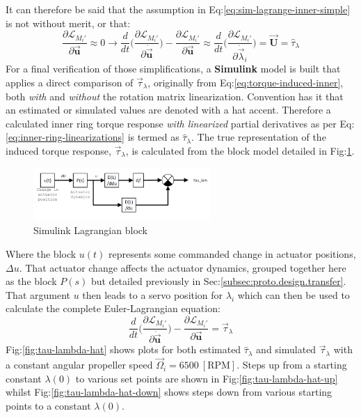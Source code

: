It can therefore be said that the assumption in Eq:\ref{eq:sim-lagrange-inner-simple} is not without merit, or that:
\begin{equation}
\frac{\partial\mathcal{L}_{M_i'}}{\partial\vec{\mathbf{u}}}\approx 0\rightarrow\frac{d}{dt}\bigg(\frac{\partial\mathcal{L}_{M_i'}}{\partial\dot{\vec{\mathbf{u}}}}\bigg)-\frac{\partial\mathcal{L}_{M_i'}}{\partial\vec{\mathbf{u}}}\approx\frac{d}{dt}\Big(\frac{\partial\mathcal{L}_{M_i'}}{\partial\dot{\vec{\lambda}}_i}\Big)=\vec{\mathbf{U}}=\hat{\tau}_\lambda
\end{equation}
For a final verification of those simplifications, a \textbf{Simulink} model is built that applies a direct comparison of $\vec{\tau}_\lambda$, originally from Eq:\ref{eq:torque-induced-inner}, both \emph{with} and \emph{without} the rotation matrix linearization. Convention has it that an estimated or simulated values are denoted with a hat accent. Therefore a calculated inner ring torque response \emph{with linearized} partial derivatives as per Eq:\ref{eq:inner-ring-linearizations} is termed as $\hat{\tau}_\lambda$. The true representation of the induced torque response, $\vec{\tau}_\lambda$, is calculated from the block model detailed in Fig:\ref{fig:linear-block}.
\begin{figure}[htbp]
\centering
\includegraphics[width=0.6\textwidth]{figs/linear-block}
\caption{Simulink Lagrangian block}
\label{fig:linear-block}
\vspace{-15pt}
\end{figure}
\par
Where the block $u(t)$ represents some commanded change in actuator positions, $\Delta u$. That actuator change affects the actuator dynamics, grouped together here as the block $P(s)$ but detailed previously in Sec:\ref{subsec:proto.design.transfer}. That argument $u$ then leads to a servo position for $\lambda_i$ which can then be used to calculate the complete Euler-Lagrangian equation:
\begin{equation}
\frac{d}{dt}\bigg(\frac{\partial\mathcal{L}_{M_i'}}{\partial\dot{\vec{\mathbf{u}}}}\bigg)-\frac{\partial\mathcal{L}_{M_i'}}{\partial\vec{\mathbf{u}}}=\vec{\tau}_\lambda
\end{equation}
Fig:\ref{fig:tau-lambda-hat} shows plots for both estimated $\hat{\tau}_\lambda$ and simulated $\vec{\tau}_\lambda$ with a constant angular propeller speed $\vec{\Omega}_i=6500~[\text{RPM}]$. Steps up from a starting constant $\lambda(0)$ to various set points are shown in Fig:\ref{fig:tau-lambda-hat-up} whilst Fig:\ref{fig:tau-lambda-hat-down} shows steps down from various starting points to a constant $\lambda(0)$. 
